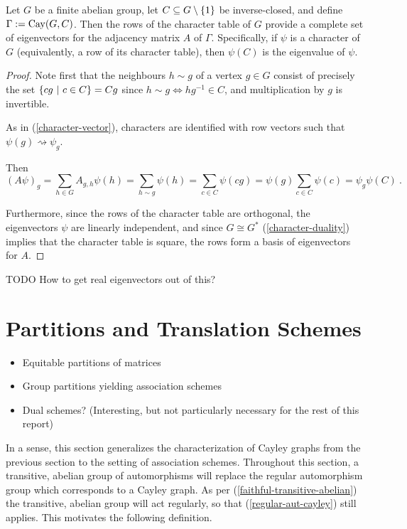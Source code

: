 \documentclass{report}
\begin{document}
    \begin{lem}\label{cayley-eigen}
      Let $G$ be a finite abelian group,
      let $C \subseteq G \setminus \left\lbrace 1 \right\rbrace$ be inverse-closed,
      and define $\Gamma := \operatorname{Cay}(G, C)$.
      Then the rows of the character table of $G$ provide a complete set of
      eigenvectors for the adjacency matrix $A$ of $\Gamma$.
      Specifically, if $\psi$ is a character of $G$ (equivalently, a row of
      its character table), then $\psi(C)$ is the eigenvalue of $\psi$.
    \end{lem}

    \begin{proof}
      Note first that the neighbours $h \sim g$ of a vertex $g \in G$ consist of
      precisely the set $\left\lbrace  cg \ \middle| \ c \in C  \right\rbrace = Cg$ since $h \sim g \iff
      hg^{-1} \in C$, and multiplication by $g$ is invertible.

      As in (\ref{character-vector}), characters are identified with row vectors
      such that $\psi(g) \rightsquigarrow \psi_g$.

      Then
      $$
        (A\psi)_g = \sum_{h \in G} A_{g, h} \psi(h)
        = \sum_{h \sim g} \psi(h) = \sum_{c \in C} \psi(cg)
        = \psi(g) \sum_{c \in C} \psi(c) = \psi_g \psi(C)
        \ .
      $$

      Furthermore, since the rows of the character table are orthogonal,
      the eigenvectors $\psi$ are linearly independent,
      and since $G \cong G^*$ (\ref{character-duality}) implies that the character table is square,
      the rows form a basis of eigenvectors for $A$.
    \end{proof}

    TODO How to get real eigenvectors out of this?

  \section{Partitions and Translation Schemes}
    \begin{itemize}
      \item Equitable partitions of matrices
      \item Group partitions yielding association schemes
      \item Dual schemes? (Interesting, but not particularly necessary for the
        rest of this report)
    \end{itemize}

    In a sense, this section generalizes the characterization of Cayley graphs
    from the previous section to the setting of association schemes.
    Throughout this section, a transitive, abelian group of automorphisms will
    replace the regular automorphism group which corresponds to a Cayley graph.
    As per (\ref{faithful-transitive-abelian}) the transitive, abelian group
    will act regularly, so that (\ref{regular-aut-cayley}) still applies.
    This motivates the following definition.
\end{document}
